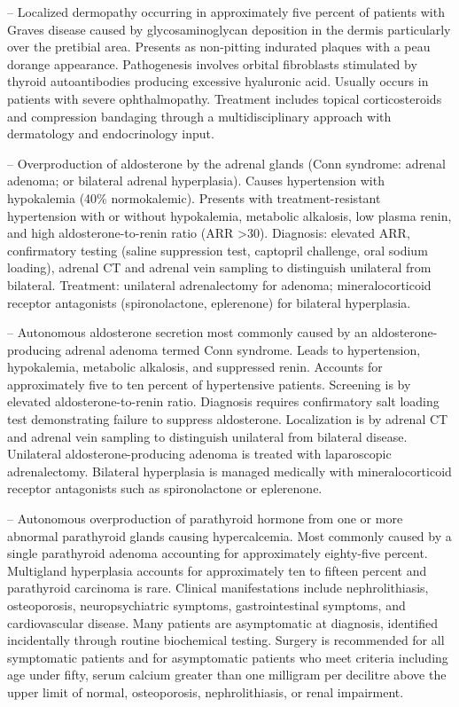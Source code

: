-- Localized dermopathy occurring in approximately five percent of patients with Graves disease caused by glycosaminoglycan deposition in the dermis particularly over the pretibial area. Presents as non-pitting indurated plaques with a peau dorange appearance. Pathogenesis involves orbital fibroblasts stimulated by thyroid autoantibodies producing excessive hyaluronic acid. Usually occurs in patients with severe ophthalmopathy. Treatment includes topical corticosteroids and compression bandaging through a multidisciplinary approach with dermatology and endocrinology input.

-- Overproduction of aldosterone by the adrenal glands (Conn syndrome: adrenal adenoma; or bilateral adrenal hyperplasia). Causes hypertension with hypokalemia (40\% normokalemic). Presents with treatment-resistant hypertension with or without hypokalemia, metabolic alkalosis, low plasma renin, and high aldosterone-to-renin ratio (ARR >30). Diagnosis: elevated ARR, confirmatory testing (saline suppression test, captopril challenge, oral sodium loading), adrenal CT and adrenal vein sampling to distinguish unilateral from bilateral. Treatment: unilateral adrenalectomy for adenoma; mineralocorticoid receptor antagonists (spironolactone, eplerenone) for bilateral hyperplasia.

-- Autonomous aldosterone secretion most commonly caused by an aldosterone-producing adrenal adenoma termed Conn syndrome. Leads to hypertension, hypokalemia, metabolic alkalosis, and suppressed renin. Accounts for approximately five to ten percent of hypertensive patients. Screening is by elevated aldosterone-to-renin ratio. Diagnosis requires confirmatory salt loading test demonstrating failure to suppress aldosterone. Localization is by adrenal CT and adrenal vein sampling to distinguish unilateral from bilateral disease. Unilateral aldosterone-producing adenoma is treated with laparoscopic adrenalectomy. Bilateral hyperplasia is managed medically with mineralocorticoid receptor antagonists such as spironolactone or eplerenone.

-- Autonomous overproduction of parathyroid hormone from one or more abnormal parathyroid glands causing hypercalcemia. Most commonly caused by a single parathyroid adenoma accounting for approximately eighty-five percent. Multigland hyperplasia accounts for approximately ten to fifteen percent and parathyroid carcinoma is rare. Clinical manifestations include nephrolithiasis, osteoporosis, neuropsychiatric symptoms, gastrointestinal symptoms, and cardiovascular disease. Many patients are asymptomatic at diagnosis, identified incidentally through routine biochemical testing. Surgery is recommended for all symptomatic patients and for asymptomatic patients who meet criteria including age under fifty, serum calcium greater than one milligram per decilitre above the upper limit of normal, osteoporosis, nephrolithiasis, or renal impairment.


